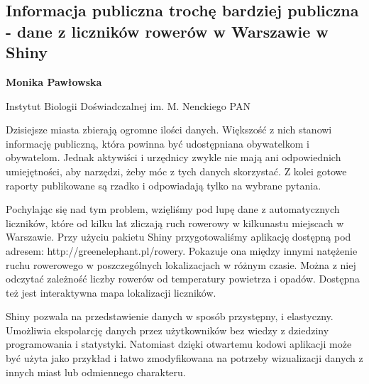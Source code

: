 \documentclass[\main/boa.tex]{subfiles}
\begin{document}
\subsection[Informacja publiczna trochę bardziej publiczna - dane z liczników rowerów \\ w Warszawie w Shiny]{Informacja publiczna trochę bardziej publiczna - dane z liczników rowerów w Warszawie w Shiny}

\begin{minipage}{0.915\textwidth}
	\centering
  {\bf {}  Monika Pawłowska}
\end{minipage}


\begin{affiliations}
\begin{minipage}{0.915\textwidth}
\centering
Instytut Biologii Doświadczalnej im. M. Nenckiego PAN   \\[-2pt]
\end{minipage}
\end{affiliations}

\vskip 0.3cm

 Dzisiejsze miasta zbierają ogromne ilości danych. Większość z nich stanowi informację publiczną, która powinna być udostępniana obywatelkom i obywatelom. Jednak aktywiści i urzędnicy zwykle nie mają ani odpowiednich umiejętności, aby narzędzi, żeby móc z tych danych skorzystać. Z kolei gotowe raporty publikowane są rzadko i odpowiadają tylko na wybrane pytania.
 
 Pochylając się nad tym problem, wzięliśmy pod lupę dane z automatycznych liczników, które od kilku lat zliczają ruch rowerowy w kilkunastu miejscach w Warszawie. Przy użyciu pakietu Shiny przygotowaliśmy aplikację dostępną pod adresem: \break http://greenelephant.pl/rowery. Pokazuje ona między innymi natężenie ruchu rowerowego w poszczególnych lokalizacjach w różnym czasie. Można z niej odczytać zależność liczby rowerów od temperatury powietrza i opadów. Dostępna też jest interaktywna mapa lokalizacji liczników.
 
 Shiny pozwala na przedstawienie danych w sposób przystępny, i elastyczny. Umożliwia ekspolarcję danych przez użytkowników bez wiedzy z dziedziny programowania i statystyki. Natomiast dzięki otwartemu kodowi aplikacji może być użyta jako przykład i łatwo zmodyfikowana na potrzeby wizualizacji danych z innych miast lub odmiennego charakteru.
\end{document}
